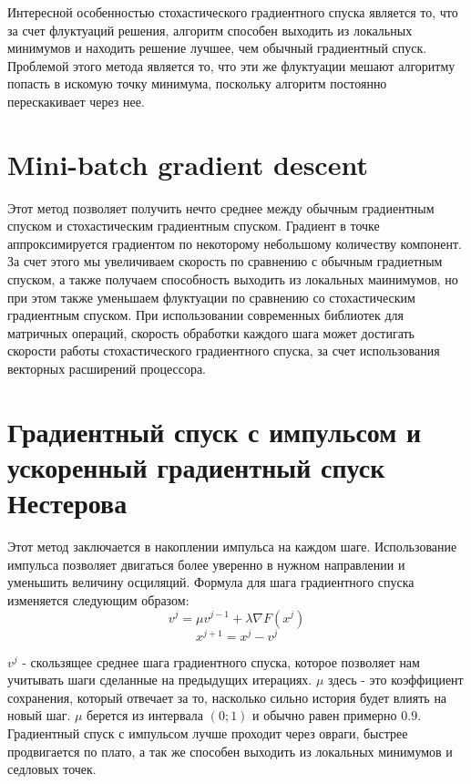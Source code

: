 \documentclass[12pt]{report}
\begin{document}
    Интересной особенностью стохастического градиентного спуска является то, что
    за счет флуктуаций решения, алгоритм способен выходить из локальных минимумов
    и находить решение лучшее, чем обычный градиентный спуск. Проблемой этого
    метода является то, что эти же флуктуации мешают алгоритму попасть в искомую
    точку минимума, поскольку алгоритм постоянно перескакивает через нее.

  \section{Mini-batch gradient descent}
    Этот метод позволяет получить нечто среднее между обычным градиентным спуском
    и стохастическим градиентным спуском. Градиент в точке аппроксимируется
    градиентом по некоторому небольшому количеству компонент. За счет этого мы
    увеличиваем скорость по сравнению с обычным градиетным спуском, а также получаем
    способность выходить из локальных маинимумов, но при этом также уменьшаем
    флуктуации по сравнению со стохастическим градиентным спуском. При использовании
    современных библиотек для матричных операций, скорость обработки каждого
    шага может достигать скорости  работы стохастического градиентного спуска,
    за счет использования векторных расширений процессора.

  \section{Градиентный спуск с импульсом и ускоренный градиентный спуск Нестерова}
    Этот метод заключается в накоплении импульса на каждом шаге. Использование
    импульса позволяет двигаться более уверенно в нужном направлении и уменьшить
    величину осциляций. Формула для шага градиентного спуска изменяется следующим
    образом:
    \begin{equation}
      v^{j} = \mu v^{j-1} + \lambda \nabla F(x^j)
    \end{equation}
    \begin{equation}
      x^{j+1} = x^j- v^j
    \end{equation}

    $v^j$ - скользящее среднее шага градиентного спуска, которое позволяет нам
    учитывать шаги сделанные на предыдущих итерациях. $\mu$ здесь - это коэффициент
    сохранения, который отвечает за то, насколько сильно история будет влиять на
    новый шаг. $\mu$ берется из интервала $(0;1)$ и обычно равен примерно $0.9$.
    Градиентный спуск с импульсом лучше проходит через овраги, быстрее продвигается
    по плато, а так же способен выходить из локальных минимумов и седловых точек.
\end{document}
